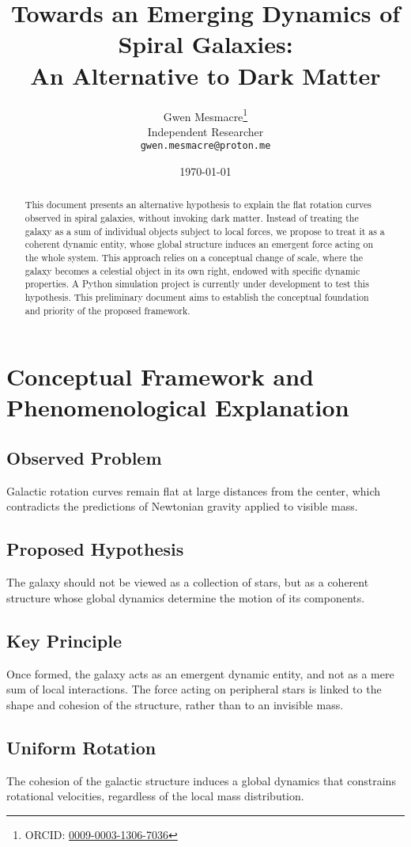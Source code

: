 \documentclass[12pt,a4paper]{article}
\title{\textbf{Towards an Emerging Dynamics of Spiral Galaxies: \\ An Alternative to Dark Matter}}
\author{
  Gwen Mesmacre\thanks{ORCID: \href{https://orcid.org/0009-0003-1306-7036}{0009-0003-1306-7036}}\\
  Independent Researcher\\
  \texttt{gwen.mesmacre@proton.me}
}
\date{\today}
\begin{document}
\maketitle

\begin{abstract}
This document presents an alternative hypothesis to explain the flat rotation curves observed in spiral galaxies, without invoking dark matter. Instead of treating the galaxy as a sum of individual objects subject to local forces, we propose to treat it as a coherent dynamic entity, whose global structure induces an emergent force acting on the whole system. This approach relies on a conceptual change of scale, where the galaxy becomes a celestial object in its own right, endowed with specific dynamic properties. A Python simulation project is currently under development to test this hypothesis. This preliminary document aims to establish the conceptual foundation and priority of the proposed framework.
\end{abstract}

\section{Conceptual Framework and Phenomenological Explanation}

\subsection{Observed Problem}
Galactic rotation curves remain flat at large distances from the center, which contradicts the predictions of Newtonian gravity applied to visible mass.

\subsection{Proposed Hypothesis}
The galaxy should not be viewed as a collection of stars, but as a coherent structure whose global dynamics determine the motion of its components.

\subsection{Key Principle}
Once formed, the galaxy acts as an emergent dynamic entity, and not as a mere sum of local interactions. The force acting on peripheral stars is linked to the shape and cohesion of the structure, rather than to an invisible mass.

\subsection{Uniform Rotation}
The cohesion of the galactic structure induces a global dynamics that constrains rotational velocities, regardless of the local mass distribution.
\end{document}
